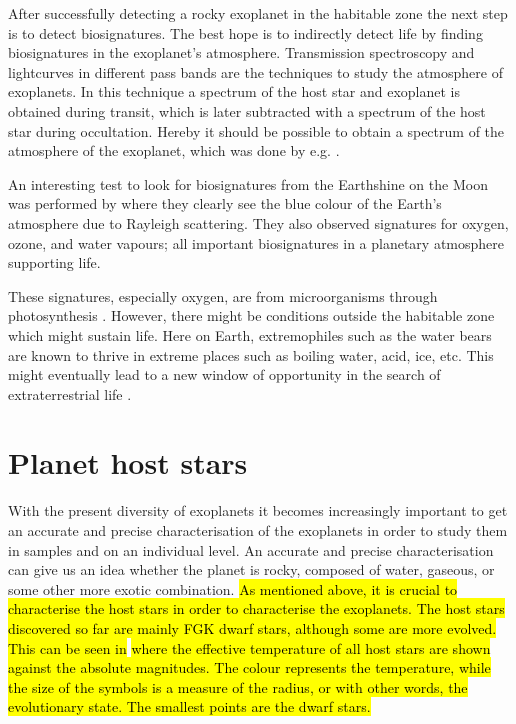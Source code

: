 After successfully detecting a rocky exoplanet in the habitable zone the next step is to detect
biosignatures. The best hope is to indirectly detect life by finding biosignatures
\citep{Kasting2002} in the exoplanet's atmosphere. Transmission spectroscopy and lightcurves in
different pass bands are the techniques to study the atmosphere of exoplanets. In this technique a
spectrum of the host star and exoplanet is obtained during transit, which is later subtracted with a
spectrum of the host star during occultation. Hereby it should be possible to obtain a spectrum of
the atmosphere of the exoplanet, which was done by e.g. \citet{Charbonneau2002}.

An interesting test to look for biosignatures from the Earthshine on the Moon was performed by
\citet{Arnold2002} where they clearly see the blue colour of the Earth's atmosphere due to Rayleigh
scattering. They also observed signatures for oxygen, ozone, and water vapours; all important
biosignatures in a planetary atmosphere supporting life.

These signatures, especially oxygen, are from microorganisms through photosynthesis
\citep[see e.g.][]{Kasting2002}. However, there might be conditions outside the habitable zone which
might sustain life. Here on Earth, extremophiles such as the water bears are known to thrive in
extreme places such as boiling water, acid, ice, etc. This might eventually lead to a new window of
opportunity in the search of extraterrestrial life \citep{Cavicchioli2002}.



\section{Planet host stars}
\label{sec:planet_host_stars}

With the present diversity of exoplanets it becomes increasingly important to get an accurate and
precise characterisation of the exoplanets in order to study them in samples and on an individual
level. An accurate and precise characterisation can give us an idea whether the planet is rocky,
composed of water, gaseous, or some other more exotic combination. \hl{As mentioned above, it is
crucial to characterise the host stars in order to characterise the exoplanets. The host stars
discovered so far are mainly FGK dwarf stars, although some are more evolved. This can be seen in}
 \hl{where the effective temperature of all host stars are shown against
the absolute magnitudes. The colour represents the temperature, while the size of the symbols is a
measure of the radius, or with other words, the evolutionary state. The smallest points are the
dwarf stars.}

